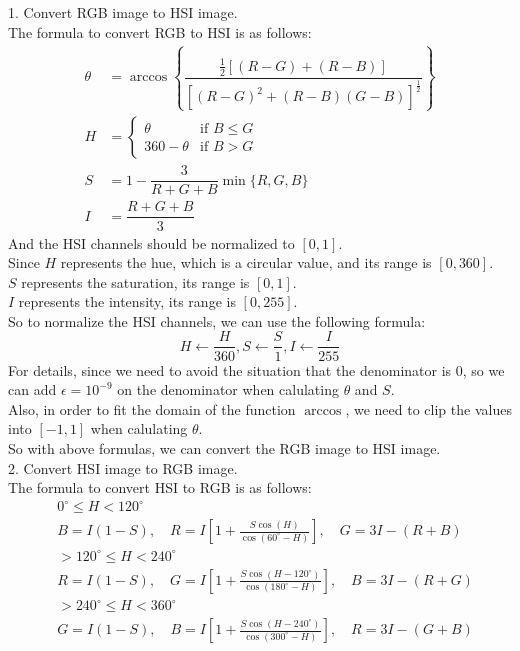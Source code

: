 
1. Convert RGB image to HSI image.\\
The formula to convert RGB to HSI is as follows:
\begin{align*}
    \theta &= \arccos\left\{ \dfrac{\frac{1}{2} [(R-G)+(R-B)]}{\left[(R-G)^2+(R-B)(G-B)\right]^{\frac{1}{2}}} \right\} \\
    H &= \begin{cases}
        \theta & \text{if } B \leq G \\
        360 - \theta & \text{if } B > G
    \end{cases} \\
    S &= 1 - \dfrac{3}{R+G+B} \min\{R,G,B\} \\
    I &= \dfrac{R+G+B}{3}
\end{align*}
And the HSI channels should be normalized to $[0,1]$.\\
Since $H$ represents the hue, which is a circular value, and its range is $[0,360]$.\\
$S$ represents the saturation, its range is $[0,1]$.\\
$I$ represents the intensity, its range is $[0,255]$.\\
So to normalize the HSI channels, we can use the following formula:
$$H \gets \dfrac{H}{360}, S \gets \dfrac{S}{1}, I \gets \dfrac{I}{255}$$
For details, since we need to avoid the situation that the denominator is $0$, so we can add $\epsilon = 10^{-9}$ on
the denominator when calulating $\theta$ and $S$.\\
Also, in order to fit the domain of the function $\arccos$, we need to clip the values into $[-1,1]$ when calulating $\theta$.\\
So with above formulas, we can convert the RGB image to HSI image.\\

2. Convert HSI image to RGB image.\\
The formula to convert HSI to RGB is as follows:
\begin{align*}
    & 0^{\circ} \leq H<120^{\circ} \\
    & B=I(1-S), \quad R=I\left[1+\frac{S \cos (H)}{\cos \left(60^{\circ}-H\right)}\right], \quad G=3 I-(R+B) \\
    & >120^{\circ} \leq H<240^{\circ} \\
    & R=I(1-S), \quad G=I\left[1+\frac{S \cos \left(H-120^{\circ}\right)}{\cos \left(180^{\circ}-H\right)}\right], \quad B=3 I-(R+G) \\
    & >240^{\circ} \leq H<360^{\circ} \quad \\
    & G=I(1-S), \quad B=I\left[1+\frac{S \cos \left(H-240^{\circ}\right)}{\cos \left(300^{\circ}-H\right)}\right], \quad R=3 I-(G+B)
\end{align*}


